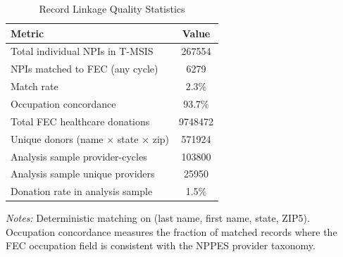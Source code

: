 \begin{table}[htbp]
\centering
\caption{Record Linkage Quality Statistics}
\label{tab:linkage}
\begin{tabular}{lc}
\toprule
Metric & Value \\
\midrule
Total individual NPIs in T-MSIS  &  267554  \\
NPIs matched to FEC (any cycle)  &  6279  \\
Match rate  &  2.3\%  \\
Occupation concordance  &  93.7\%  \\
Total FEC healthcare donations  &  9748472  \\
Unique donors (name $\times$ state $\times$ zip)  &  571924  \\
Analysis sample provider-cycles  &  103800  \\
Analysis sample unique providers  &  25950  \\
Donation rate in analysis sample  &  1.5\%  \\
\bottomrule
\end{tabular}
\par\smallskip\small\textit{Notes:} Deterministic matching on (last name, first name, state, ZIP5). Occupation concordance measures the fraction of matched records where the FEC occupation field is consistent with the NPPES provider taxonomy.
\end{table}
